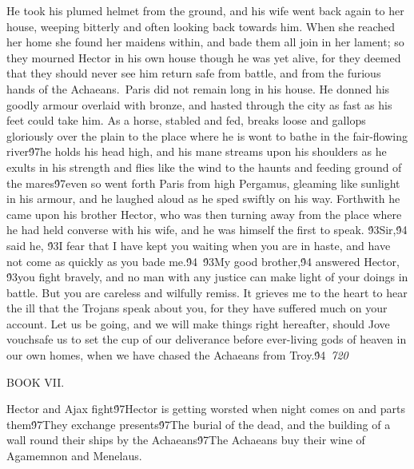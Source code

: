 {He took his plumed helmet from the ground, and his wife went back again to her house, weeping bitterly and often looking back towards him. When she reached her home she found her maidens within, and bade them all join in her lament; so they mourned Hector in his own house though he was yet alive, for they deemed that they should never see him return safe from battle, and from the furious hands of the Achaeans.\
Paris did not remain long in his house. He donned his goodly armour overlaid with bronze, and hasted through the city as fast as his feet could take him. As a horse, stabled and fed, breaks loose and gallops gloriously over the plain to the place where he is wont to bathe in the fair-flowing river\'97he holds his head high, and his mane streams upon his shoulders as he exults in his strength and flies like the wind to the haunts and feeding ground of the mares\'97even so went forth Paris from high Pergamus, gleaming like sunlight in his armour, and he laughed aloud as he sped swiftly on his way. Forthwith he came upon his brother Hector, who was then turning away from the place where he had held converse with his wife, and he was himself the first to speak. \'93Sir,\'94 said he, \'93I fear that I have kept you waiting when you are in haste, and have not come as quickly as you bade me.\'94\
\'93My good brother,\'94 answered Hector, \'93you fight bravely, and no man with any justice can make light of your doings in battle. But you are careless and wilfully remiss. It grieves me to the heart to hear the ill that the Trojans speak about you, for they have suffered much on your account. Let us be going, and we will make things right hereafter, should Jove vouchsafe us to set the cup of our deliverance before ever-living gods of heaven in our own homes, when we have chased the Achaeans from Troy.\'94\
\pard{}\sl720\qc{}

\fs48 \cf2 BOOK VII.\
\pard\pardeftab720\li1710\ri1710\sa64\qj\partightenfactor0

  Hector and Ajax fight\'97Hector is getting worsted when night comes on and parts them\'97They exchange presents\'97The burial of the dead, and the building of a wall round their ships by the Achaeans\'97The Achaeans buy their wine of Agamemnon and Menelaus.\
\pard{}\qj{}

}
